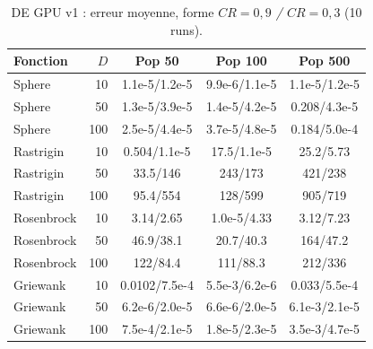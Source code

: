 \begin{table}[!t]\centering\scriptsize\setlength{\tabcolsep}{2pt}\caption{DE GPU v1 : erreur moyenne, forme \emph{$CR{=}0{,}9$ / $CR{=}0{,}3$} (10 runs).}\label{tab:cr}
\begin{tabular}{lr|ccc}\toprule Fonction & $D$ & Pop 50 & Pop 100 & Pop 500\\\midrule
Sphere & 10 & 1.1e-5/1.2e-5 & 9.9e-6/1.1e-5 & 1.1e-5/1.2e-5\\
Sphere & 50 & 1.3e-5/3.9e-5 & 1.4e-5/4.2e-5 & 0.208/4.3e-5\\
Sphere & 100 & 2.5e-5/4.4e-5 & 3.7e-5/4.8e-5 & 0.184/5.0e-4\\
Rastrigin & 10 & 0.504/1.1e-5 & 17.5/1.1e-5 & 25.2/5.73\\
Rastrigin & 50 & 33.5/146 & 243/173 & 421/238\\
Rastrigin & 100 & 95.4/554 & 128/599 & 905/719\\
Rosenbrock & 10 & 3.14/2.65 & 1.0e-5/4.33 & 3.12/7.23\\
Rosenbrock & 50 & 46.9/38.1 & 20.7/40.3 & 164/47.2\\
Rosenbrock & 100 & 122/84.4 & 111/88.3 & 212/336\\
Griewank & 10 & 0.0102/7.5e-4 & 5.5e-3/6.2e-6 & 0.033/5.5e-4\\
Griewank & 50 & 6.2e-6/2.0e-5 & 6.6e-6/2.0e-5 & 6.1e-3/2.1e-5\\
Griewank & 100 & 7.5e-4/2.1e-5 & 1.8e-5/2.3e-5 & 3.5e-3/4.7e-5\\
\bottomrule\end{tabular}\end{table}
